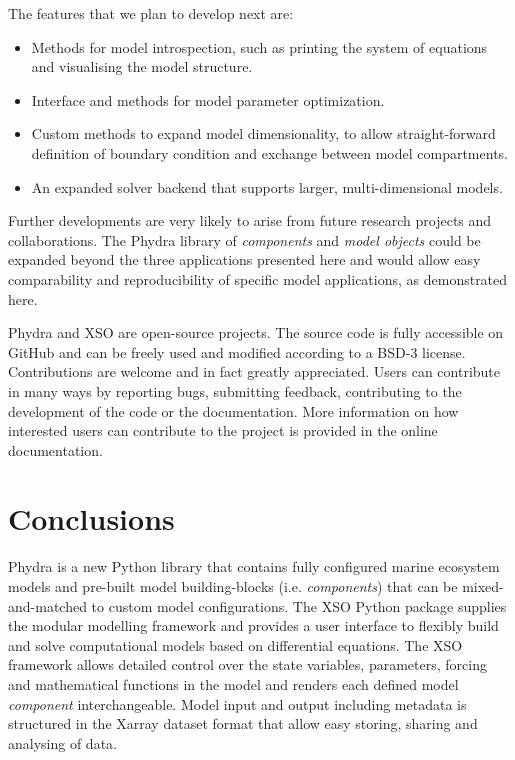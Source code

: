 \documentclass[journal abbreviation, manuscript]{copernicus}
\begin{document}
The features that we plan to develop next are: 

\begin{itemize}
    \item Methods for model introspection, such as printing the system of equations and visualising the model structure.
    \item Interface and methods for model parameter optimization.
    \item Custom methods to expand model dimensionality, to allow straight-forward definition of boundary condition and exchange between model compartments.
    \item An expanded solver backend that supports larger, multi-dimensional models.
\end{itemize}

Further developments are very likely to arise from future research projects and collaborations. The Phydra library of \textit{components} and \textit{model objects} could be expanded beyond the three applications presented here and would allow easy comparability and reproducibility of specific model applications, as demonstrated here.

Phydra and XSO are open-source projects. The source code is fully accessible on GitHub and can be freely used and modified according to a BSD-3 license. Contributions are welcome and in fact greatly appreciated. Users can contribute in many ways by reporting bugs, submitting feedback, contributing to the development of the code or the documentation. More information on how interested users can contribute to the project is provided in the online documentation.


\section{Conclusions}

Phydra is a new Python library that contains fully configured marine ecosystem models and pre-built model building-blocks (i.e. \textit{components}) that can be mixed-and-matched to custom model configurations. The XSO Python package supplies the modular modelling framework and provides a user interface to flexibly build and solve computational models based on differential equations. The XSO framework allows detailed control over the state variables, parameters, forcing and mathematical functions in the model and renders each defined model \textit{component} interchangeable. Model input and output including metadata is structured in the Xarray dataset format that allow easy storing, sharing and analysing of data.
\end{document}
